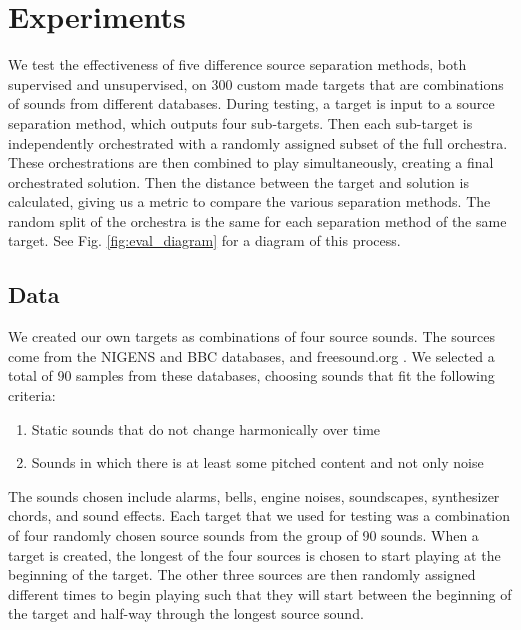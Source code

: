 \documentclass{article}
\begin{document}
	
	\section{Experiments}\label{sec:experiments}
	
	We test the effectiveness of five difference source separation methods, both supervised and unsupervised, on 300 custom made targets that are combinations of sounds from different databases. During testing, a target is input to a source separation method, which outputs four sub-targets. Then each sub-target is independently orchestrated with a randomly assigned subset of the full orchestra. These orchestrations are then combined to play simultaneously, creating a final orchestrated solution. Then the distance between the target and solution is calculated, giving us a metric to compare the various separation methods. The random split of the orchestra is the same for each separation method of the same target. See Fig. \ref{fig:eval_diagram} for a diagram of this process.
	
		\subsection{Data}\label{subsec:data}
		We created our own targets as combinations of four source sounds. The sources come from the NIGENS \cite{NIGENS} and BBC \cite{BBC} databases, and freesound.org \cite{freesound}. We selected a total of 90 samples from these databases, choosing sounds that fit the following criteria: 
		
		\begin{enumerate}
			\item Static sounds that do not change harmonically over time
			\item Sounds in which there is at least some pitched content and not only noise
		\end{enumerate}			
		The sounds chosen include alarms, bells, engine noises, soundscapes, synthesizer chords, and sound effects. Each target that we used for testing was a combination of four randomly chosen source sounds from the group of 90 sounds. 
		When a target is created, the longest of the four sources is chosen to start playing at the beginning of the target. The other three sources are then randomly assigned different times to begin playing such that they will start between the beginning of the target and half-way through the longest source sound.
		
\end{document}

